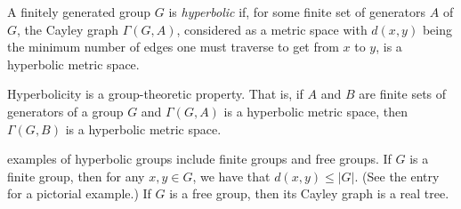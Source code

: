 \documentclass[12pt]{article}
\begin{document}
A finitely generated group $G$ is \emph{hyperbolic} if, for some finite set of generators $A$ of $G$, the Cayley graph $\Gamma(G,A)$, considered as a metric space with $d(x,y)$ being the minimum number of edges one must traverse to get from $x$ to $y$, is a hyperbolic metric space.

Hyperbolicity is a group-theoretic property.  That is, if $A$ and $B$ are finite sets of generators of a group $G$ and $\Gamma(G,A)$ is a hyperbolic metric space, then $\Gamma(G,B)$ is a hyperbolic metric space.

 examples of hyperbolic groups include finite groups and free groups.  If $G$ is a finite group, then for any $x,y \in G$, we have that $d(x,y) \le |G|$.  (See the entry  for a pictorial example.)  If $G$ is a free group, then its Cayley graph is a real tree.
\end{document}
